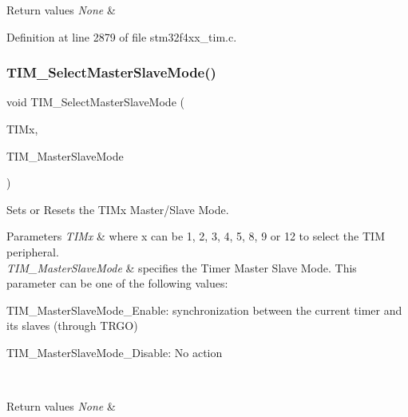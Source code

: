 \begin{DoxyRetVals}{Return values}
{\em None} & \\
\hline
\end{DoxyRetVals}


Definition at line 2879 of file stm32f4xx\+\_\+tim.\+c.

\mbox{\label{group___t_i_m_ga4dcc3d11b670c381d0ff9cb7e9fd01e2}} 
\subsubsection{\texorpdfstring{T\+I\+M\+\_\+\+Select\+Master\+Slave\+Mode()}{TIM\_SelectMasterSlaveMode()}}
{\footnotesize\ttfamily void T\+I\+M\+\_\+\+Select\+Master\+Slave\+Mode (\begin{DoxyParamCaption}\item[{\hyperlink{struct_t_i_m___type_def}{T\+I\+M\+\_\+\+Type\+Def} $\ast$}]{T\+I\+Mx,  }\item[{uint16\+\_\+t}]{T\+I\+M\+\_\+\+Master\+Slave\+Mode }\end{DoxyParamCaption})}



Sets or Resets the T\+I\+Mx Master/\+Slave Mode. 


\begin{DoxyParams}{Parameters}
{\em T\+I\+Mx} & where x can be 1, 2, 3, 4, 5, 8, 9 or 12 to select the T\+IM peripheral. \\
\hline
{\em T\+I\+M\+\_\+\+Master\+Slave\+Mode} & specifies the Timer Master Slave Mode. This parameter can be one of the following values\+: \begin{DoxyItemize}
\item T\+I\+M\+\_\+\+Master\+Slave\+Mode\+\_\+\+Enable\+: synchronization between the current timer and its slaves (through T\+R\+GO) \item T\+I\+M\+\_\+\+Master\+Slave\+Mode\+\_\+\+Disable\+: No action \end{DoxyItemize}
\\
\hline
\end{DoxyParams}

\begin{DoxyRetVals}{Return values}
{\em None} & \\
\hline
\end{DoxyRetVals}


